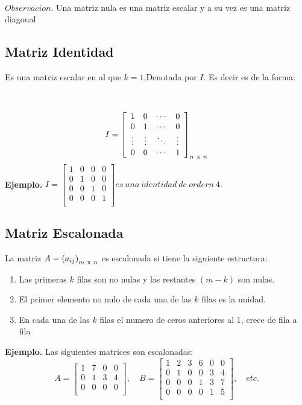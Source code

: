 \documentclass[11pt, conference]{IEEEtran}
\begin{document}
{\

$Observacion.$ Una matriz nula es una matriz escalar y a su vez es una matriz diagonal
\subsection{Matriz Identidad}
Es una matriz escalar en al que $k = 1$,Denotada por $I$. Es decir es de la forma:

\

\[
	I = \left[
  \begin{array}{cccc}
  1 & 0 & \cdots & 0 \\
  0 & 1 & \cdots & 0 \\
  \vdots & \vdots &\ddots & \vdots \\
  0 & 0 & \cdots & 1 \\
  \end{array} \right]_{n\ \textnormal{x}\ n}
\]
\textbf{Ejemplo.}
$
	I = \left[
    \begin{array}{cccc}
    	1 & 0 & 0 & 0 \\
        0 & 1 & 0 & 0\\
        0 & 0 & 1 & 0 \\
        0 & 0 & 0 & 1 \\
    \end{array}
    \right]
    es\ una\ identidad\ de\ ordern\ 4.
$
\subsection{Matriz Escalonada}
La matriz $A = \left(a_{ij}\right)_{m\ \textnormal{x}\ n}$ es escalonada si tiene la siguiente estructura:
	\begin{enumerate}
    	\item Las primeras $k$ filas son no nulas y las restantes $\left(m - k\right)$ son nulas.
        \item El primer elemento no nulo de cada una de las $k$ filas es la unidad.
        \item En cada una de las $k$ filas el numero de ceros anteriores al 1, crece de fila a fila 
    \end{enumerate}
\textbf{Ejemplo.} Las siguientes matrices son escalonadas:
\[
	A = \left[
    \begin{array}{cccc}
    1 & 7 & 0 & 0 \\
    0 & 1 & 3 & 4 \\
    0 & 0 & 0 & 0\\
    \end{array}
    \right],\quad 
    B = \left[
    \begin{array}{cccccc}
    1 & 2 & 3 & 6 & 0 & 0 \\
    0 & 1 & 0 & 0 & 3 & 4 \\
    0 & 0 & 0 & 1 & 3 & 7\\
    0 & 0 & 0 & 0 & 1 & 5 \\
    \end{array}
    \right],\quad etc.
\]

}
\end{document}
